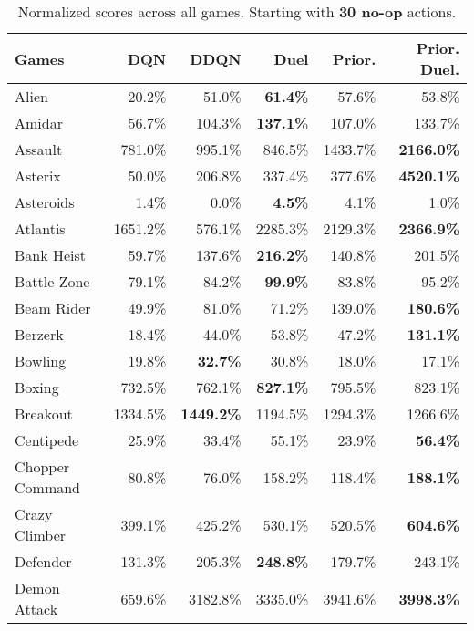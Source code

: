 \begin{table}[!htb]
\caption{Normalized scores across all games. Starting with {\bf 30 no-op} actions.}
\footnotesize
\begin{center}
\begin{tabular}{l|rrr|rr}
       {\sc Games} &   {\sc DQN} &       {\sc DDQN} &       {\sc Duel} &{\sc Prior.} & {\sc Prior. Duel.} \\
\hline
               Alien &    20.2\% &    51.0\% &{\bf61.4\%}&    57.6\% &      53.8\% \\
              Amidar &    56.7\% &   104.3\% &{\bf137.1\%}&   107.0\% &     133.7\% \\
             Assault &   781.0\% &   995.1\% &   846.5\% &  1433.7\% &{\bf2166.0\%}\\
             Asterix &    50.0\% &   206.8\% &   337.4\% &   377.6\% &{\bf4520.1\%}\\
           Asteroids &     1.4\% &     0.0\% &{\bf4.5\%}&     4.1\% &       1.0\% \\
            Atlantis &  1651.2\% &   576.1\% &  2285.3\% &  2129.3\% &{\bf2366.9\%}\\
          Bank Heist &    59.7\% &   137.6\% &{\bf216.2\%}&   140.8\% &     201.5\% \\
         Battle Zone &    79.1\% &    84.2\% &{\bf99.9\%}&    83.8\% &      95.2\% \\
          Beam Rider &    49.9\% &    81.0\% &    71.2\% &   139.0\% &{\bf180.6\%}\\
             Berzerk &    18.4\% &    44.0\% &    53.8\% &    47.2\% &{\bf131.1\%}\\
             Bowling &    19.8\% &{\bf32.7\%}&    30.8\% &    18.0\% &      17.1\% \\
              Boxing &   732.5\% &   762.1\% &{\bf827.1\%}&   795.5\% &     823.1\% \\
            Breakout &  1334.5\% &{\bf1449.2\%}&  1194.5\% &  1294.3\% &    1266.6\% \\
           Centipede &    25.9\% &    33.4\% &    55.1\% &    23.9\% &{\bf56.4\%}\\
     Chopper Command &    80.8\% &    76.0\% &   158.2\% &   118.4\% &{\bf188.1\%}\\
       Crazy Climber &   399.1\% &   425.2\% &   530.1\% &   520.5\% &{\bf604.6\%}\\
            Defender &   131.3\% &   205.3\% &{\bf248.8\%}&   179.7\% &     243.1\% \\
        Demon Attack &   659.6\% &  3182.8\% &  3335.0\% &  3941.6\% &{\bf3998.3\%}\\

\end{tabular}
\end{center}
\end{table}
